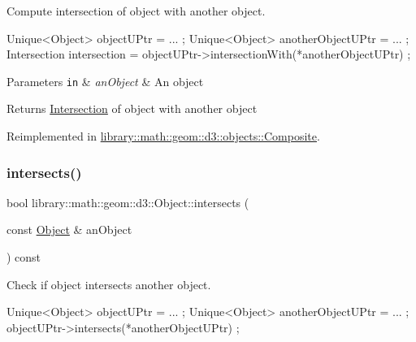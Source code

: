 Compute intersection of object with another object. 


\begin{DoxyCode}
Unique<Object> objectUPtr = ... ;
Unique<Object> anotherObjectUPtr = ... ;
Intersection intersection = objectUPtr->intersectionWith(*anotherObjectUPtr) ;
\end{DoxyCode}



\begin{DoxyParams}[1]{Parameters}
\mbox{\tt in}  & {\em an\+Object} & An object \\
\hline
\end{DoxyParams}
\begin{DoxyReturn}{Returns}
\hyperlink{classlibrary_1_1math_1_1geom_1_1d3_1_1_intersection}{Intersection} of object with another object 
\end{DoxyReturn}


Reimplemented in \hyperlink{classlibrary_1_1math_1_1geom_1_1d3_1_1objects_1_1_composite_a5af4610cb68cb31bc5be14c06829c116}{library\+::math\+::geom\+::d3\+::objects\+::\+Composite}.

\mbox{\label{classlibrary_1_1math_1_1geom_1_1d3_1_1_object_a98c37b46f2fdc5f22bc123a757dcf73e}} 
\subsubsection{\texorpdfstring{intersects()}{intersects()}}
{\footnotesize\ttfamily bool library\+::math\+::geom\+::d3\+::\+Object\+::intersects (\begin{DoxyParamCaption}\item[{const \hyperlink{classlibrary_1_1math_1_1geom_1_1d3_1_1_object}{Object} \&}]{an\+Object }\end{DoxyParamCaption}) const\hspace{0.3cm}{\ttfamily [virtual]}}



Check if object intersects another object. 


\begin{DoxyCode}
Unique<Object> objectUPtr = ... ;
Unique<Object> anotherObjectUPtr = ... ;
objectUPtr->intersects(*anotherObjectUPtr) ;
\end{DoxyCode}



